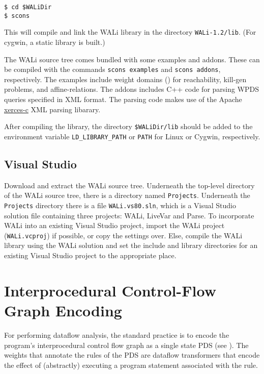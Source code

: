 \documentclass[english,a4paper,11pt]{article}
\theoremstyle{definition}
\def\WALi{\textsf{WALi}\xspace}
\begin{document}
\vspace{1em}
\noindent
\begin{cmdbox}
\begin{verbatim}
$ cd $WALiDir
$ scons 
\end{verbatim}
\end{cmdbox}
\vspace{1em}

\noindent This will compile and link the \WALi library in the directory
\verb!WALi-1.2/lib!. (For cygwin, a static library is built.) 

The \WALi source tree comes bundled with some examples and addons. These can be
compiled with the commands \verb!scons examples! and \verb!scons addons!,
respectively. The examples include weight domains ()
for reachability, kill-gen problems, and affine-relations. The addons includes
C++ code for parsing WPDS queries specified in XML format. The parsing code
makes use of the Apache
\href{http://xerces.apache.org/xerces-c/}{xerces-c} XML parsing
libarary.

After compiling the library, the directory \verb!$WALiDir/lib! should be added
to the environment variable \verb!LD_LIBRARY_PATH! or \verb!PATH! for Linux or
Cygwin, respectively.

\subsection{Visual Studio}
\label{Se:VisualStudio}
Download and extract the \WALi source tree. Underneath the top-level directory of the \WALi
source tree, there is a directory named \verb!Projects!. Underneath the
\verb!Projects! directory there is a file \verb!WALi.vs80.sln!, which is a
Visual Studio solution file containing three projects: \WALi, LiveVar and
Parse. To incorporate \WALi into an existing Visual Studio project, import the
\WALi project (\verb!WALi.vcproj!) if possible, or copy the settings over.
Else, compile the \WALi library using the \WALi solution and set the include and
library directories for an existing Visual Studio project to the appropriate
place.

\section{Interprocedural Control-Flow Graph Encoding}
\label{Se:icfg-encoding}
For performing dataflow analysis, the standard practice is to encode the
program's interprocedural control flow graph as a single state PDS (see
). The weights that annotate the rules of the PDS are
dataflow transformers that encode the effect of (abstractly) executing a
program statement associated with the rule.
\end{document}
